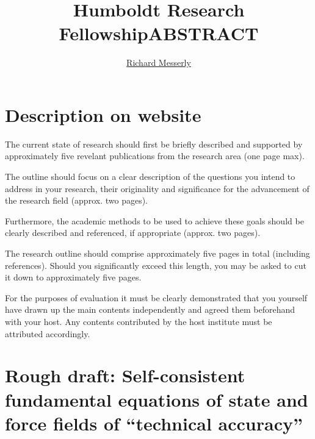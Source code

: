 \documentclass[11pt,a4paper]{article}
\begin{document}
	\thispagestyle{empty}
	\title{\Large \textbf{Humboldt Research Fellowship}}
	\author[1]{\large {\underline{Richard Messerly}}}%
	
	
	\date{} %
	\maketitle\thispagestyle{empty} %
	\begin{center}
		\title{\textbf{ABSTRACT}}\centering{}
	\end{center}
	\justify

\section{Description on website}

The current state of research should first be briefly described and supported by approximately five revelant publications from the research area (one page max).

The outline should focus on a clear description of the questions you intend to address in your research, their originality and significance for the advancement of the research field (approx. two pages).

Furthermore, the academic methods to be used to achieve these goals should be clearly described and referenced, if appropriate (approx. two pages).

The research outline should comprise approximately five pages in total (including references). Should you significantly exceed this length, you may be asked to cut it down to approximately five pages.

For the purposes of evaluation it must be clearly demonstrated that you yourself have drawn up the main contents independently and agreed them beforehand with your host. Any contents contributed by the host institute must be attributed accordingly.

\section{Rough draft: Self-consistent fundamental equations of state and force fields of ``technical accuracy''}
\end{document}
